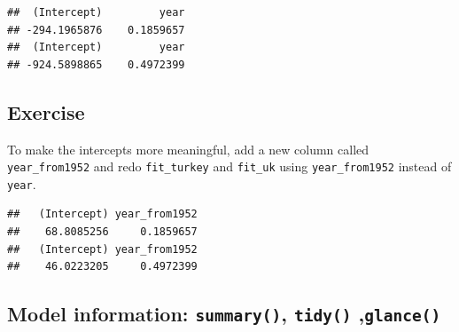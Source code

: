 \documentclass[]{book}
\makeatletter
\newenvironment{Shaded}{\begin{snugshade}}{\end{snugshade}}
\newcommand{\KeywordTok}[1]{\textcolor[rgb]{0.13,0.29,0.53}{\textbf{#1}}}
\newcommand{\DataTypeTok}[1]{\textcolor[rgb]{0.13,0.29,0.53}{#1}}
\newcommand{\DecValTok}[1]{\textcolor[rgb]{0.00,0.00,0.81}{#1}}
\newcommand{\StringTok}[1]{\textcolor[rgb]{0.31,0.60,0.02}{#1}}
\newcommand{\OperatorTok}[1]{\textcolor[rgb]{0.81,0.36,0.00}{\textbf{#1}}}
\newcommand{\NormalTok}[1]{#1}
\newenvironment{kframe}{%
\medskip{}
\setlength{\fboxsep}{.8em}
 \def\at@end@of@kframe{}%
 \ifinner\ifhmode%
  \def\at@end@of@kframe{\end{minipage}}%
  \begin{minipage}{\columnwidth}%
 \fi\fi%
 \def\FrameCommand##1{\hskip\@totalleftmargin \hskip-\fboxsep
 \colorbox{shadecolor}{##1}\hskip-\fboxsep
     \hskip-\linewidth \hskip-\@totalleftmargin \hskip\columnwidth}%
 \MakeFramed {\advance\hsize-\width
   \@totalleftmargin\z@ \linewidth\hsize
   \@setminipage}}%
 {\par\unskip\endMakeFramed%
 \at@end@of@kframe}
\renewenvironment{Shaded}{\begin{kframe}}{\end{kframe}}
\makeatother
\begin{document}
\begin{verbatim}
##  (Intercept)         year 
## -294.1965876    0.1859657 
##  (Intercept)         year 
## -924.5898865    0.4972399
\end{verbatim}

\subsection{Exercise}\label{exercise-37}

To make the intercepts more meaningful, add a new column called
\texttt{year\_from1952} and redo \texttt{fit\_turkey} and
\texttt{fit\_uk} using \texttt{year\_from1952} instead of \texttt{year}.

\begin{Shaded}
\end{Shaded}

\begin{verbatim}
##   (Intercept) year_from1952 
##    68.8085256     0.1859657 
##   (Intercept) year_from1952 
##    46.0223205     0.4972399
\end{verbatim}

\subsection{\texorpdfstring{Model information: \texttt{summary()},
\texttt{tidy()}
,\texttt{glance()}}{Model information: summary(), tidy() ,glance()}}\label{model-information-summary-tidy-glance}
\end{document}
